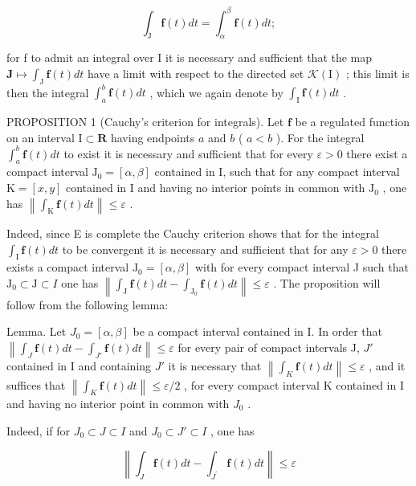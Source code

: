 \[
\int_ {\mathrm{J}} \mathbf {f} (t) d t = \int_ {\alpha} ^ {\beta} \mathbf {f} (t) d t;
\]

for f to admit an integral over I it is necessary and sufficient that the map \(\mathbf{J} \mapsto \int_{\mathrm{J}} \mathbf{f}(t) dt\) have a limit with respect to the directed set \(\mathcal{K}(\mathrm{I})\) ; this limit is then the integral \(\int_{a}^{b} \mathbf{f}(t) dt\) , which we again denote by \(\int_{\mathrm{I}} \mathbf{f}(t) dt\) .

PROPOSITION 1 (Cauchy's criterion for integrals). Let \(\mathbf{f}\) be a regulated function on an interval \(\mathrm{I} \subset \mathbf{R}\) having endpoints \(a\) and \(b\) ( \(a < b\) ). For the integral \(\int_{a}^{b} \mathbf{f}(t) dt\) to exist it is necessary and sufficient that for every \(\varepsilon > 0\) there exist a compact interval \(\mathrm{J}_0 = [\alpha, \beta]\) contained in I, such that for any compact interval \(\mathrm{K} = [x, y]\) contained in I and having no interior points in common with \(\mathrm{J}_0\) , one has \(\left\| \int_{\mathrm{K}} \mathbf{f}(t) dt \right\| \leqslant \varepsilon\) .

Indeed, since E is complete the Cauchy criterion shows that for the integral \(\int_{\mathrm{I}} \mathbf{f}(t) dt\) to be convergent it is necessary and sufficient that for any \(\varepsilon > 0\) there exists a compact interval \(\mathrm{J}_0 = [\alpha, \beta]\) with for every compact interval J such that \(\mathrm{J}_0 \subset \mathrm{J} \subset I\) one has \(\left\| \int_{\mathrm{J}} \mathbf{f}(t) dt - \int_{\mathrm{J}_0} \mathbf{f}(t) dt \right\| \leqslant \varepsilon\) . The proposition will follow from the following lemma:

Lemma. Let \(J_{0} = [\alpha, \beta]\) be a compact interval contained in I. In order that \(\left\|\int_{J} \mathbf{f}(t) dt - \int_{J'} \mathbf{f}(t) dt\right\| \leqslant \varepsilon\) for every pair of compact intervals J, \(J'\) contained in I and containing \(J'\) it is necessary that \(\left\|\int_{K} \mathbf{f}(t) dt\right\| \leqslant \varepsilon\) , and it suffices that \(\left\|\int_{K} \mathbf{f}(t) dt\right\| \leqslant \varepsilon/2\) , for every compact interval K contained in I and having no interior point in common with \(J_{0}\) .

Indeed, if for \(J_{0} \subset J \subset I\) and \(J_{0} \subset J' \subset I\) , one has

\[
\left\| \int_ {J} \mathbf {f} (t) d t - \int_ {J ^ {\prime}} \mathbf {f} (t) d t \right\| \leqslant \varepsilon
\]

